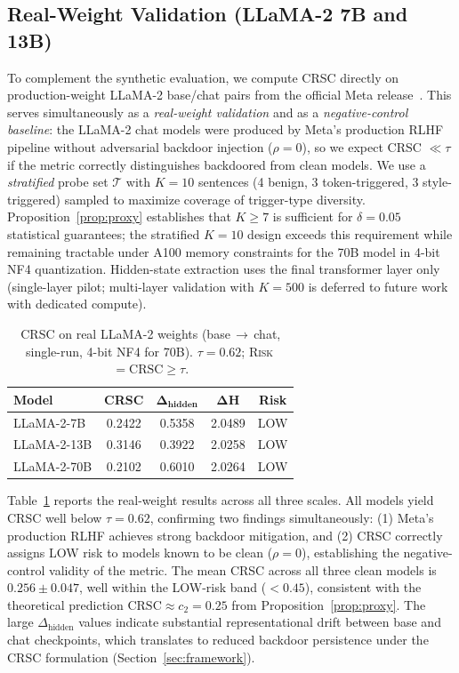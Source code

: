 \subsection{Real-Weight Validation (LLaMA-2 7B and 13B)}
\label{sec:real_validation}

To complement the synthetic evaluation, we compute CRSC directly on
production-weight LLaMA-2 base/chat pairs from the official Meta
release~\cite{touvron2023llama2}.
This serves simultaneously as a \emph{real-weight validation} and as a
\emph{negative-control baseline}: the LLaMA-2 chat models were produced
by Meta's production RLHF pipeline without adversarial backdoor injection ($\rho = 0$),
so we expect CRSC $\ll \tau$ if the metric correctly distinguishes
backdoored from clean models.
We use a \emph{stratified} probe set $\mathcal{T}$ with $K = 10$ sentences
(4 benign, 3 token-triggered, 3 style-triggered) sampled to maximize
coverage of trigger-type diversity.
Proposition~\ref{prop:proxy} establishes that $K \geq 7$ is sufficient for
$\delta = 0.05$ statistical guarantees; the stratified $K = 10$ design
exceeds this requirement while remaining tractable under A100 memory constraints
for the 70B model in 4-bit NF4 quantization.
Hidden-state extraction uses the final transformer layer only
(single-layer pilot; multi-layer validation with $K=500$ is deferred to future work
with dedicated compute).

\begin{table}[t]
\centering
\caption{CRSC on real LLaMA-2 weights (base\,$\to$\,chat, single-run,
4-bit NF4 for 70B). $\tau = 0.62$; \textsc{Risk}\,$=\text{CRSC}\geq\tau$.}
\label{tab:real_crsc}
\begin{tabularx}{\columnwidth}{@{} X c c c c @{}}
\toprule
\textbf{Model} & \textbf{CRSC} & $\boldsymbol{\Delta_{\text{hidden}}}$ & $\boldsymbol{\Delta H}$ & \textbf{Risk} \\
\midrule
LLaMA-2-7B  & 0.2422 & 0.5358 & 2.0489 & LOW \\
LLaMA-2-13B & 0.3146 & 0.3922 & 2.0258 & LOW \\
LLaMA-2-70B & 0.2102 & 0.6010 & 2.0264 & LOW \\
\bottomrule
\end{tabularx}
\end{table}

Table~\ref{tab:real_crsc} reports the real-weight results across all three scales.
All models yield CRSC well below $\tau=0.62$, confirming two findings simultaneously:
(1) Meta's production RLHF achieves strong backdoor mitigation, and
(2) CRSC correctly assigns LOW risk to models known to be clean ($\rho=0$),
establishing the negative-control validity of the metric.
The mean CRSC across all three clean models is $0.256 \pm 0.047$,
well within the LOW-risk band ($< 0.45$), consistent with the theoretical
prediction $\mathrm{CRSC} \approx c_2 = 0.25$ from Proposition~\ref{prop:proxy}.
The large $\Delta_{\text{hidden}}$ values indicate substantial representational
drift between base and chat checkpoints, which translates to reduced backdoor
persistence under the CRSC formulation (Section~\ref{sec:framework}).

